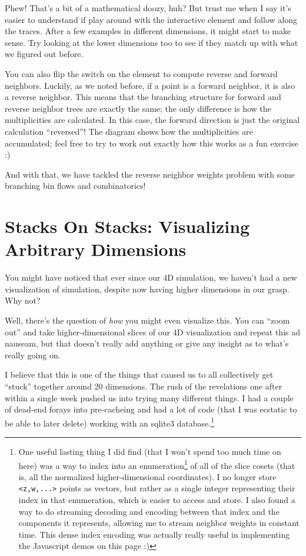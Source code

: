 \documentclass[]{article}
\renewcommand{\href}[2]{#2\footnote{\url{#1}}}
\begin{document}
Phew! That's a bit of a mathematical doozy, huh? But trust me when I say it's
easier to understand if play around with the interactive element and follow
along the traces. After a few examples in different dimensions, it might start
to make sense. Try looking at the lower dimensions too to see if they match up
with what we figured out before.

You can also flip the switch on the element to compute reverse and forward
neighbors. Luckily, as we noted before, if a point is a forward neighbor, it is
also a reverse neighbor. This means that the branching structure for forward and
reverse neighbor trees are exactly the same; the only difference is how the
multiplicities are calculated. In this case, the forward direction is just the
original calculation ``reversed''! The diagram shows how the multiplicities are
accumulated; feel free to try to work out exactly how this works as a fun
exercise :)

And with that, we have tackled the reverse neighbor weights problem with some
branching bin flows and combinatorics!

\hypertarget{stacks-on-stacks-visualizing-arbitrary-dimensions}{%
\section{Stacks On Stacks: Visualizing Arbitrary
Dimensions}\label{stacks-on-stacks-visualizing-arbitrary-dimensions}}

You might have noticed that ever since our 4D simulation, we haven't had a new
visualization of simulation, despite now having higher dimensions in our grasp.
Why not?

Well, there's the question of \emph{how} you might even visualize this. You can
``zoom out'' and take higher-dimensional slices of our 4D visualization and
repeat this ad nauseam, but that doesn't really add anything or give any insight
as to what's really going on.

I believe that this is one of the things that caused us to all collectively get
``stuck'' together around 20 dimensions. The rush of the revelations one after
within a single week pushed us into trying many different things. I had a couple
of dead-end forays into pre-cacheing and had a lot of code (that I was ecstatic
to be able to later delete) working with an sqlite3 database.\footnote{One
  useful lasting thing I did find (that I won't spend too much time on here) was
  a way to
  \href{https://www.reddit.com/r/adventofcode/comments/kfb6zx/day_17_getting_to_t6_at_for_higher_spoilerss/gim68l0/}{index
  into an enumeration} of all of the slice cosets (that is, all the normalized
  higher-dimensional coordinates). I no longer store
  \texttt{\textless{}z,w,...\textgreater{}} points as vectors, but rather as a
  single integer representing their index in that enumeration, which is easier
  to access and store. I also found a way to do streaming decoding and encoding
  between that index and the components it represents, allowing me to stream
  neighbor weights in constant time. This dense index encoding was actually
  really useful in implementing the Javascript demos on this page :)}
\end{document}
